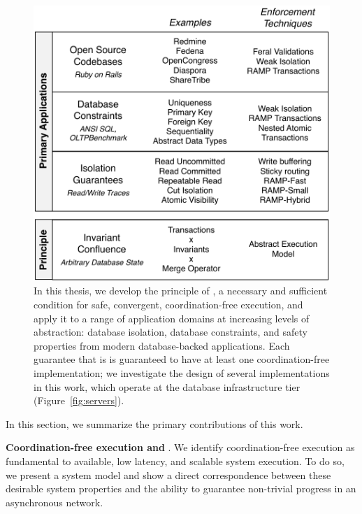 \begin{figure}[t!]
\includegraphics[width=\figscale\columnwidth]{diagram/contributions.pdf}
\vspace{.75em}
\caption{In this thesis, we develop the principle of \IConfluence, a
  necessary and sufficient condition for safe, convergent,
  coordination-free execution, and apply it to a range of application
  domains at increasing levels of abstraction: database isolation,
  database constraints, and safety properties from modern
  database-backed applications. Each guarantee that is \iconfluent is
  guaranteed to have at least one coordination-free implementation; we
  investigate the design of several implementations in this work,
  which operate at the database infrastructure tier (Figure~\ref{fig:servers}).}
\label{fig:contribs}
\end{figure}


In this section, we summarize the primary contributions of this work.

\newcommand{\contribution}[1]{\vspace{.5em}\noindent\textbf{#1}.\xspace\xspace}
 \contribution{Coordination-free execution and \IConfluence}  We identify coordination-free execution as fundamental to available,
 low latency, and scalable system execution. To do so, we present a
 system model and show a direct correspondence between these desirable
 system properties and the ability to guarantee non-trivial progress
 in an asynchronous network.

